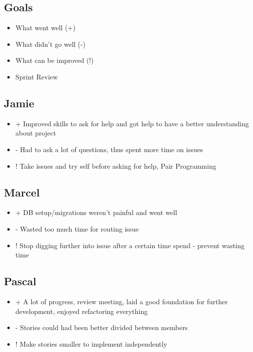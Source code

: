 \subsection{Goals}
\begin{itemize}
    \item What went well (+)
    \item What didn't go well (-)
    \item What can be improved (!)
    \item Sprint Review
\end{itemize}

\subsection{Jamie}
\begin{itemize}
    \item + Improved skills to ask for help and got help to have a better understanding about project
    \item - Had to ask a lot of questions, thus spent more time on issues
    \item ! Take issues and try self before asking for help, Pair Programming
\end{itemize}

\subsection{Marcel}
\begin{itemize}
    \item + DB setup/migrations weren't painful and went well
    \item - Wasted too much time for routing issue
    \item ! Stop digging further into issue after a certain time spend - prevent wasting time
\end{itemize}

\subsection{Pascal}
\begin{itemize}
    \item + A lot of progress, review meeting, laid a good foundation for further development, enjoyed refactoring everything
    \item - Stories could had been better divided between members
    \item ! Make stories smaller to implement independently
\end{itemize}

